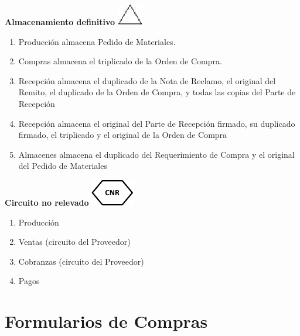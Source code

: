 \begin{center}
  \textbf{Almacenamiento definitivo}
  \includegraphics{./Images/Simbolos/simbolo-Almacenamiento-Definitivo.png}
\end{center}
\begin{enumerate}
  \item Producción almacena Pedido de Materiales.
  \item Compras almacena el triplicado de la Orden de Compra.
  \item Recepción almacena el duplicado de la Nota de Reclamo, el original del Remito, el duplicado de la Orden de Compra, y todas las copias del Parte de Recepción
  \item Recepción almacena el original del Parte de Recepción firmado, su duplicado firmado, el triplicado y el original de la Orden de Compra
  \item Almacenes almacena el duplicado del Requerimiento de Compra y el original del Pedido de Materiales
\end{enumerate}

\begin{center}
  \textbf{Circuito no relevado}
  \includegraphics{./Images/Simbolos/simbolo-CNR.png}
\end{center}
\begin{enumerate}
  \item Producción
  \item Ventas (circuito del Proveedor)
  \item Cobranzas (circuito del Proveedor)
  \item Pagos
\end{enumerate}

\pagebreak
\section{Formularios de Compras}

